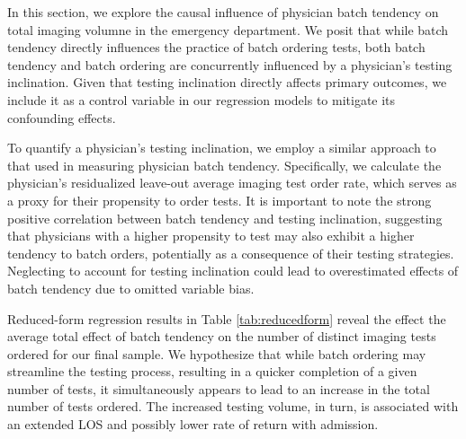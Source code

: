 \documentclass{article}
\begin{document}
In this section, we explore the causal influence of physician batch
tendency on total imaging volumne in the emergency department. We posit
that while batch tendency directly influences the practice of batch
ordering tests, both batch tendency and batch ordering are concurrently
influenced by a physician's testing inclination. Given that testing
inclination directly affects primary outcomes, we include it as a
control variable in our regression models to mitigate its confounding
effects.

To quantify a physician's testing inclination, we employ a similar
approach to that used in measuring physician batch tendency.
Specifically, we calculate the physician's residualized leave-out
average imaging test order rate, which serves as a proxy for their
propensity to order tests. It is important to note the strong positive
correlation between batch tendency and testing inclination, suggesting
that physicians with a higher propensity to test may also exhibit a
higher tendency to batch orders, potentially as a consequence of their
testing strategies. Neglecting to account for testing inclination could
lead to overestimated effects of batch tendency due to omitted variable
bias.

Reduced-form regression results in Table \ref{tab:reducedform} reveal
the effect the average total effect of batch tendency on the number of
distinct imaging tests ordered for our final sample. We hypothesize that
while batch ordering may streamline the testing process, resulting in a
quicker completion of a given number of tests, it simultaneously appears
to lead to an increase in the total number of tests ordered. The
increased testing volume, in turn, is associated with an extended LOS
and possibly lower rate of return with admission.
\end{document}
